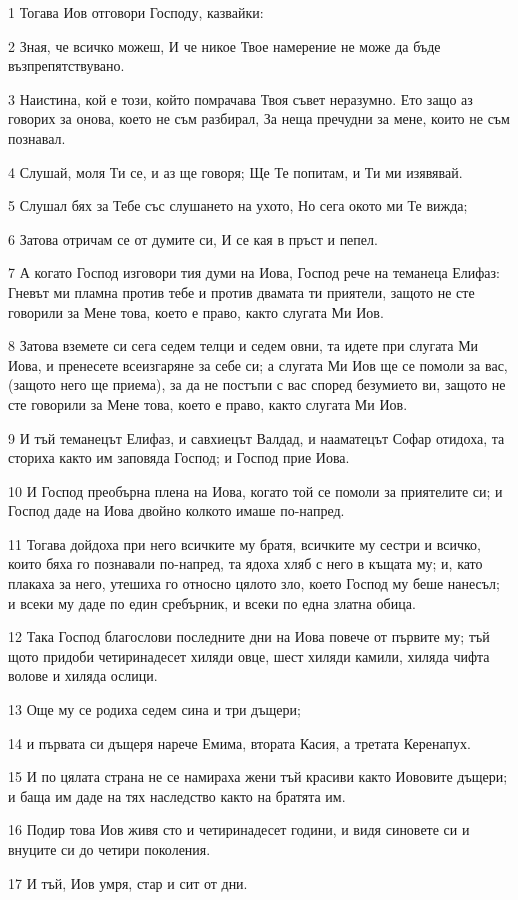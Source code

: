 \par 1 Тогава Иов отговори Господу, казвайки:
\par 2 Зная, че всичко можеш, И че никое Твое намерение не може да бъде възпрепятствувано.
\par 3 Наистина, кой е този, който помрачава Твоя съвет неразумно. Ето защо аз говорих за онова, което не съм разбирал, За неща пречудни за мене, които не съм познавал.
\par 4 Слушай, моля Ти се, и аз ще говоря; Ще Те попитам, и Ти ми изявявай.
\par 5 Слушал бях за Тебе със слушането на ухото, Но сега окото ми Те вижда;
\par 6 Затова отричам се от думите си, И се кая в пръст и пепел.
\par 7 А когато Господ изговори тия думи на Иова, Господ рече на теманеца Елифаз: Гневът ми пламна против тебе и против двамата ти приятели, защото не сте говорили за Мене това, което е право, както слугата Ми Иов.
\par 8 Затова вземете си сега седем телци и седем овни, та идете при слугата Ми Иова, и пренесете всеизгаряне за себе си; а слугата Ми Иов ще се помоли за вас, (защото него ще приема), за да не постъпи с вас според безумието ви, защото не сте говорили за Мене това, което е право, както слугата Ми Иов.
\par 9 И тъй теманецът Елифаз, и савхиецът Валдад, и нааматецът Софар отидоха, та сториха както им заповяда Господ; и Господ прие Иова.
\par 10 И Господ преобърна плена на Иова, когато той се помоли за приятелите си; и Господ даде на Иова двойно колкото имаше по-напред.
\par 11 Тогава дойдоха при него всичките му братя, всичките му сестри и всичко, които бяха го познавали по-напред, та ядоха хляб с него в къщата му; и, като плакаха за него, утешиха го относно цялото зло, което Господ му беше нанесъл; и всеки му даде по един сребърник, и всеки по една златна обица.
\par 12 Така Господ благослови последните дни на Иова повече от първите му; тъй щото придоби четиринадесет хиляди овце, шест хиляди камили, хиляда чифта волове и хиляда ослици.
\par 13 Още му се родиха седем сина и три дъщери;
\par 14 и първата си дъщеря нарече Емима, втората Касия, а третата Керенапух.
\par 15 И по цялата страна не се намираха жени тъй красиви както Иововите дъщери; и баща им даде на тях наследство както на братята им.
\par 16 Подир това Иов живя сто и четиринадесет години, и видя синовете си и внуците си до четири поколения.
\par 17 И тъй, Иов умря, стар и сит от дни.

